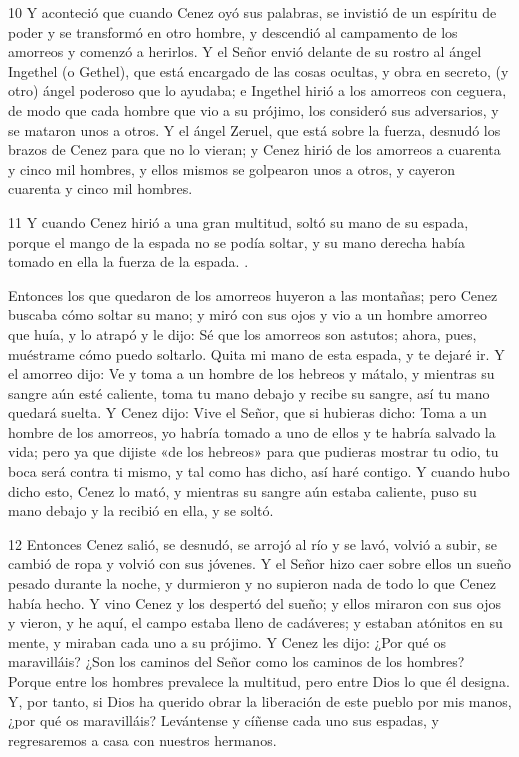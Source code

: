 \par 10 Y aconteció que cuando Cenez oyó sus palabras, se invistió de un espíritu de poder y se transformó en otro hombre, y descendió al campamento de los amorreos y comenzó a herirlos. Y el Señor envió delante de su rostro al ángel Ingethel (o Gethel), que está encargado de las cosas ocultas, y obra en secreto, (y otro) ángel poderoso que lo ayudaba; e Ingethel hirió a los amorreos con ceguera, de modo que cada hombre que vio a su prójimo, los consideró sus adversarios, y se mataron unos a otros. Y el ángel Zeruel, que está sobre la fuerza, desnudó los brazos de Cenez para que no lo vieran; y Cenez hirió de los amorreos a cuarenta y cinco mil hombres, y ellos mismos se golpearon unos a otros, y cayeron cuarenta y cinco mil hombres.

\par 11 Y cuando Cenez hirió a una gran multitud, soltó su mano de su espada, porque el mango de la espada no se podía soltar, y su mano derecha había tomado en ella la fuerza de la espada. .

Entonces los que quedaron de los amorreos huyeron a las montañas; pero Cenez buscaba cómo soltar su mano; y miró con sus ojos y vio a un hombre amorreo que huía, y lo atrapó y le dijo: Sé que los amorreos son astutos; ahora, pues, muéstrame cómo puedo soltarlo. Quita mi mano de esta espada, y te dejaré ir. Y el amorreo dijo: Ve y toma a un hombre de los hebreos y mátalo, y mientras su sangre aún esté caliente, toma tu mano debajo y recibe su sangre, así tu mano quedará suelta. Y Cenez dijo: Vive el Señor, que si hubieras dicho: Toma a un hombre de los amorreos, yo habría tomado a uno de ellos y te habría salvado la vida; pero ya que dijiste «de los hebreos» para que pudieras mostrar tu odio, tu boca será contra ti mismo, y tal como has dicho, así haré contigo. Y cuando hubo dicho esto, Cenez lo mató, y mientras su sangre aún estaba caliente, puso su mano debajo y la recibió en ella, y se soltó.

\par 12 Entonces Cenez salió, se desnudó, se arrojó al río y se lavó, volvió a subir, se cambió de ropa y volvió con sus jóvenes. Y el Señor hizo caer sobre ellos un sueño pesado durante la noche, y durmieron y no supieron nada de todo lo que Cenez había hecho. Y vino Cenez y los despertó del sueño; y ellos miraron con sus ojos y vieron, y he aquí, el campo estaba lleno de cadáveres; y estaban atónitos en su mente, y miraban cada uno a su prójimo. Y Cenez les dijo: ¿Por qué os maravilláis? ¿Son los caminos del Señor como los caminos de los hombres? Porque entre los hombres prevalece la multitud, pero entre Dios lo que él designa. Y, por tanto, si Dios ha querido obrar la liberación de este pueblo por mis manos, ¿por qué os maravilláis? Levántense y cíñense cada uno sus espadas, y regresaremos a casa con nuestros hermanos.

